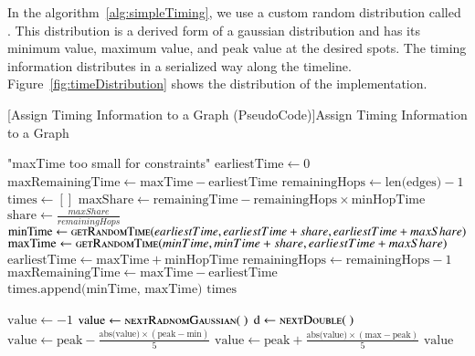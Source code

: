 In the algorithm~\ref{alg:simpleTiming}, we use a custom random distribution called . This distribution is a derived form of a gaussian distribution and has its minimum value, maximum value, and peak value at the desired spots. The timing information distributes in a serialized way along the timeline. Figure~\ref{fig:timeDistribution} shows the distribution of the implementation.

\begin{algorithm}
	[Assign Timing Information to a Graph (PseudoCode)]{Assign Timing Information to a Graph}\label{alg:simpleTiming}
	\begin{algorithmic}[1]
				\Throw "maxTime too small for constraints"
			\EndIf
			\State $\text{earliestTime} \gets 0$
			\State $\text{maxRemainingTime} \gets \text{maxTime}-\text{earliestTime}$
			\State $\text{remainingHops} \gets \text{len(edges)} - 1$
			\State $\text{times} \gets []$
				\State $\text{maxShare} \gets \text{remainingTime} - \text{remainingHops}\times\text{minHopTime}$
				\State $\text{share} \gets \frac{maxShare}{remainingHops}$
				\State $\text{minTime} \gets \Call{getRandomTime}{earliestTime, earliestTime+share, earliestTime+maxShare}$
				\State $\text{maxTime} \gets \Call{getRandomTime}{minTime, minTime+share, earliestTime+maxShare}$
				\State $\text{earliestTime} \gets \text{maxTime}+\text{minHopTime}$
				\State $\text{remainingHops} \gets \text{remainingHops} - 1$
				\State $\text{maxRemainingTime} \gets \text{maxTime}-\text{earliestTime}$
				\State $\text{times.append(minTime, maxTime)}$
			\EndFor
			\Return $\text{times}$
		\EndFunction
		\item[]		
		\label{alg:timingDistribution-line}
			\State $\text{value} \gets -1$
				\State $\text{value} \gets \Call{nextRadnomGaussian}{~}$
				\State $\text{d} \gets \Call{nextDouble}{~}$
					\State $\text{value} \gets \text{peak} - \frac{\text{abs(value)} \times (\text{peak} - \text{min})}{5}$
				\Else
					\State $\text{value} \gets \text{peak} + \frac{\text{abs(value)} \times (\text{max} - \text{peak})}{5}$
				\EndIf
			\EndWhile
			\Return $\text{value}$
		\EndFunction
	\end{algorithmic}
\end{algorithm}

